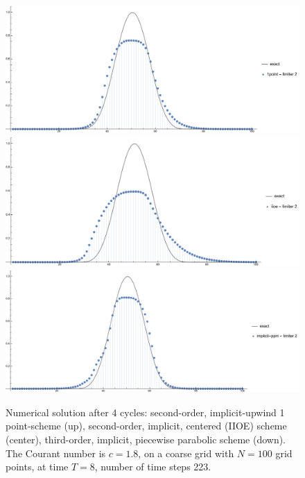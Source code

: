 \documentclass[../thesis.tex]{subfiles}
\begin{document}
\begin{figure}[H]
	\centering
	\includegraphics[width=\textwidth]{fig-1point-c1p8-T8-limit2-smooth.pdf}
	\includegraphics[width=\textwidth]{fig-iioe-c1p8-T8-limit2-smooth.pdf}
	\includegraphics[width=\textwidth]{fig-implicit-ppm-c1p8-T8-limit2-smooth.pdf}
	\caption{Numerical solution after 4 cycles: second-order, implicit-upwind 1 point-scheme (up), second-order, implicit, centered (IIOE) scheme (center), third-order, implicit, piecewise parabolic scheme (down). The Courant number is \(c = 1.8\), on a coarse grid with \(N = 100\) grid points, at time \(T = 8\), number of time steps 223.}
	\label{fig:c1p8-T8-limit2-smooth}
\end{figure}
\end{document}
